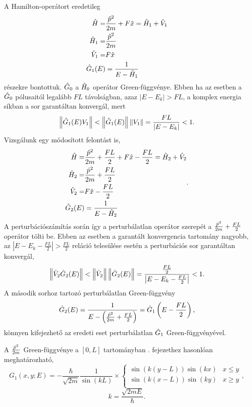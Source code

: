 A Hamilton-operátort eredetileg
\begin{equation}
	\begin{aligned}
		\hat{H}=&\frac{\hat{p}^2}{2m}+F\hat{x}=\hat{H}_1+\hat{V}_1\\
		\hat{H}_1=&\frac{\hat{p}^2}{2m}\\
		\hat{V}_1=&F\hat{x}\\
		\hat{G}_1(E)&=\frac{1}{E-\hat{H}_1}
	\end{aligned}
\end{equation}
részekre bontottuk. $\hat{G}_0$ a $\hat{H}_0$ operátor Green-függvénye. Ebben ha az esetben a $\hat{G}_0$ pólusaitól legalább $FL$ távolságban, azaz $\rvert E-E_k\lvert>FL$, a komplex energia síkban a sor garantáltan konvergál, mert
\begin{equation}
	\left\lVert \hat{G}_1(E)V_1 \right\rVert<\left\lVert \hat{G}_1(E) \right\rVert\left\lVert V_1 \right\rVert=\frac{FL}{\rvert E-E_k\lvert}<1.
\end{equation}
Vizsgálunk egy módosított felontást is,
\begin{equation}
	\begin{aligned}
		\hat{H}=&\frac{\hat{p}^2}{2m}+\frac{FL}{2}+F\hat{x}-\frac{FL}{2}=\hat{H}_2+\hat{V}_2\\
		\hat{H}_2=&\frac{\hat{p}^2}{2m}+\frac{FL}{2}\\
		\hat{V}_2=&F\hat{x}-\frac{FL}{2}\\
		\hat{G}_2(E)&=\frac{1}{E-\hat{H}_2}
	\end{aligned}.
\end{equation}
A perturbációszámítás során így a perturbálatlan operátor szerepét a $\frac{\hat{p}^2}{2m}+\frac{FL}{2}$ operátor tölti be.
Ebben az esetben a garantált konvergencia tartomány nagyobb, az $\left\lvert E-E_k-\frac{FL}{2}\right\rvert > \frac{FL}{2}$ reláció telesülése esetén a perturbációs sor garantáltan konvergál,
\begin{equation}
	\left\lVert \hat{V}_2\hat{G}_2(E) \right\rVert<\left\lVert \hat{V}_2 \right\rVert\left\lVert \hat{G}_2(E) \right\rVert=\frac{\frac{FL}{2}}{\left\lvert E-E_k-\frac{FL}{2}\right\rvert}<1.
\end{equation}
A második sorhoz tartozó perturbálatlan Green-függvény
\begin{equation}
	\hat{G}_2(E)=\frac{1}{E-\left(\frac{\hat{p}^2}{2m}+\frac{FL}{2}\right)}=\hat{G}_1\left(E-\frac{FL}{2}\right),
\end{equation}
könnyen kifejezhető az eredeti eset perturbálatlan $\hat{G}_1$ Green-függvényével.

A $\frac{\hat{p}^2}{2m}$ Green-függvénye a $[0,L]$ tartományban . fejezethez hasonlóan meghatározható,
\begin{equation}
	G_1\left(x,y;E\right) = -\frac{\hbar}{\sqrt{2m}}\frac{1}{\sin\left(kL\right)}\times
	\begin{cases}
		\sin\left(k\left(y-L\right)\right)\sin\left(kx\right) & x\leq y\\
		\sin\left(k\left(x-L\right)\right)\sin\left(ky\right) & x\geq y\\
	\end{cases},
\end{equation}
\begin{equation}
	k = \frac{\sqrt{2mE}}{\hbar}.
\end{equation}

